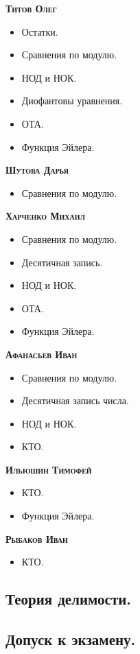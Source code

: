 \documentclass[12pt]{article}
\begin{document}
    \textbf{\textsc{Титов Олег}}
    \begin{itemize}
        \item Остатки.
        \item Сравнения по модулю.
        \item НОД и НОК.
        \item Диофантовы уравнения.
        \item ОТА.
        \item Функция Эйлера.
    \end{itemize}
    \textbf{\textsc{Шутова Дарья}}
    \begin{itemize}
        \item Сравнения по модулю.
    \end{itemize}
    \textbf{\textsc{Харченко Михаил}}
    \begin{itemize}
        \item Сравнения по модулю.
        \item Десятичная запись.
        \item НОД и НОК.
        \item ОТА.
        \item Функция Эйлера.
    \end{itemize}
    \textbf{\textsc{Афанасьев Иван}}
    \begin{itemize}
        \item Сравнения по модулю.
        \item Десятичная запись числа.
        \item НОД и НОК.
        \item КТО.
    \end{itemize}
    \textbf{\textsc{Ильюшин Тимофей}}
    \begin{itemize}
        \item КТО.
        \item Функция Эйлера.
    \end{itemize}
    \textbf{\textsc{Рыбаков Иван}}
    \begin{itemize}
        \item КТО.
    \end{itemize}

    \newpage
    \begin{center}
        \section*{Теория делимости.}
        \subsection*{Допуск к экзамену.}
    \end{center}
\end{document}
